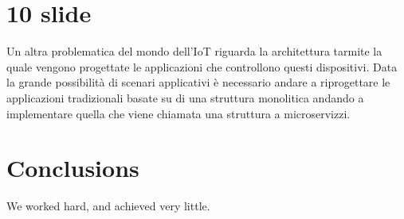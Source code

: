 \documentclass[12pt]{article}
\begin{document}
\section{10 slide}
Un altra problematica del mondo dell'IoT riguarda la architettura tarmite la
quale vengono progettate le applicazioni che controllono questi dispositivi.
Data la grande possibilità di scenari applicativi è necessario andare a
riprogettare le applicazioni tradizionali basate su di una struttura monolitica
andando a implementare quella che viene chiamata una struttura a microservizzi.



\section{Conclusions}\label{conclusions}
We worked hard, and achieved very little.



\end{document}
